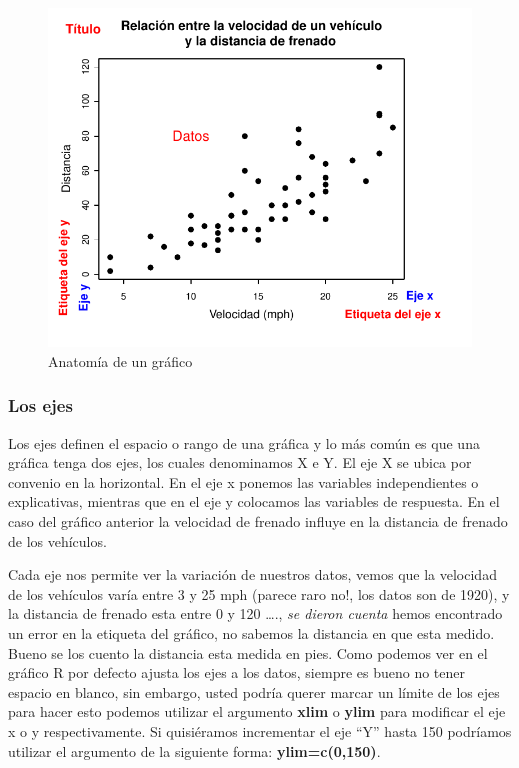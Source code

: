 \documentclass[]{article}
\begin{document}
\begin{figure}

{\centering \includegraphics{index_files/figure-latex/unnamed-chunk-9-1} 

}

\caption{Anatomía de un gráfico}\label{fig:unnamed-chunk-9}
\end{figure}

\subsubsection{Los ejes}\label{los-ejes}

Los ejes definen el espacio o rango de una gráfica y lo más común es que
una gráfica tenga dos ejes, los cuales denominamos X e Y. El eje X se
ubica por convenio en la horizontal. En el eje x ponemos las variables
independientes o explicativas, mientras que en el eje y colocamos las
variables de respuesta. En el caso del gráfico anterior la velocidad de
frenado influye en la distancia de frenado de los vehículos.

Cada eje nos permite ver la variación de nuestros datos, vemos que la
velocidad de los vehículos varía entre 3 y 25 mph (parece raro no!, los
datos son de 1920), y la distancia de frenado esta entre 0 y 120
\ldots{}., \emph{se dieron cuenta} hemos encontrado un error en la
etiqueta del gráfico, no sabemos la distancia en que esta medido. Bueno
se los cuento la distancia esta medida en pies. Como podemos ver en el
gráfico R por defecto ajusta los ejes a los datos, siempre es bueno no
tener espacio en blanco, sin embargo, usted podría querer marcar un
límite de los ejes para hacer esto podemos utilizar el argumento
\textbf{xlim} o \textbf{ylim} para modificar el eje x o y
respectivamente. Si quisiéramos incrementar el eje ``Y'' hasta 150
podríamos utilizar el argumento de la siguiente forma:
\textbf{ylim=c(0,150)}.
\end{document}

